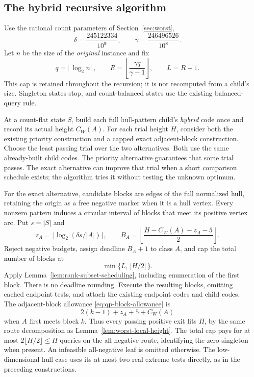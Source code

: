 

\subsection{The hybrid recursive algorithm}

Use the rational count parameters of Section~\ref{sec:worst},
\[
 \delta=\frac{245122334}{10^9},\qquad
 \gamma=\frac{246496526}{10^8}.
\]
Let $n$ be the size of the \emph{original} instance and fix
\begin{equation}\label{eq:global-slot-cap}
 q=\lceil\log_2n\rceil,\qquad
 R=\left\lfloor\frac{\gamma q}{\gamma-1}\right\rfloor,
 \qquad L=R+1.
\end{equation}
This cap is retained throughout the recursion; it is not recomputed
from a child's size. Singleton states stop, and count-balanced states
use the existing balanced-query rule.

At a count-flat state $S$, build each full hull-pattern child's
\emph{hybrid} code once and record its actual height $C_W(A)$.
For each trial height $H$, consider both the existing priority
construction and a capped exact adjacent-block construction. Choose
the least passing trial over the two alternatives. Both use the same
already-built child codes.
The priority alternative guarantees that some trial passes. The exact
alternative can improve that trial when a short comparison schedule
exists; the algorithm tries it without testing the unknown optimum.

For the exact alternative, candidate blocks are edges of the full
normalized hull, retaining the origin as a free negative marker when
it is a hull vertex. Every nonzero pattern induces a circular interval
of blocks that meet its positive vertex arc. Put $s=|S|$ and
\[
 z_A=\lfloor\log_2(\delta s/|A|)\rfloor,\qquad
 B_A=\left\lfloor\frac{H-C_W(A)-z_A-5}{2}\right\rfloor.
\]
Reject negative budgets, assign deadline $B_A+1$ to class $A$, and
cap the total number of blocks at
\begin{equation}\label{eq:hybrid-total-cap}
 \min\{L,\lfloor H/2\rfloor\}.
\end{equation}
Apply Lemma~\ref{lem:rank-subset-scheduling}, including enumeration
of the first block. There is no deadline rounding. Execute the
resulting blocks, omitting cached endpoint tests, and attach the
existing endpoint codes and child codes. The adjacent-block allowance
\eqref{eq:qp-block-allowance} is
\begin{equation}\label{eq:slot-block-allowance}
 2(k-1)+z_A+5+C_W(A)
\end{equation}
when $A$ first meets block $k$. Thus every passing positive exit fits
$H$, by the same route decomposition as
Lemma~\ref{lem:worst-local-height}. The total cap pays for at most
$2\lfloor H/2\rfloor\le H$
queries on the all-negative route, identifying the zero singleton
when present. An infeasible all-negative leaf is omitted otherwise.
The low-dimensional hull case uses its at most two real extreme tests
directly, as in the preceding constructions.

